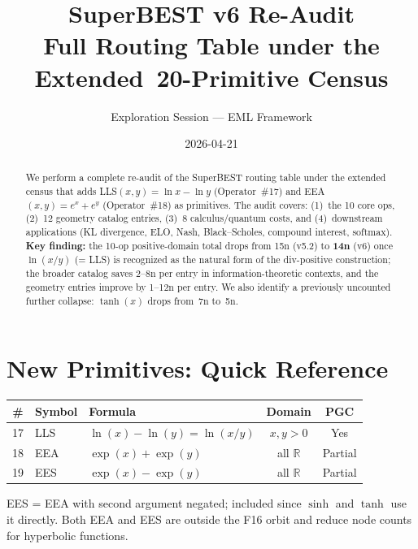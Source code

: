 \documentclass[11pt]{article}
\title{SuperBEST v6 Re-Audit\\
{\large Full Routing Table under the Extended~20-Primitive Census}}
\author{Exploration Session --- EML Framework}
\date{2026-04-21}
\begin{document}
\maketitle

\begin{abstract}
We perform a complete re-audit of the SuperBEST routing table under the
extended census that adds LLS$(x,y)=\ln x - \ln y$ (Operator~\#17) and
EEA$(x,y)=e^x+e^y$ (Operator~\#18) as primitives.
The audit covers: (1)~the 10 core ops, (2)~12 geometry catalog entries,
(3)~8 calculus/quantum costs, and (4)~downstream applications
(KL divergence, ELO, Nash, Black--Scholes, compound interest, softmax).
\textbf{Key finding:} the 10-op positive-domain total drops from 15n (v5.2) to
\textbf{14n} (v6) once $\ln(x/y)$ (= LLS) is recognized as the natural form
of the div-positive construction; the broader catalog saves 2--8n per entry
in information-theoretic contexts, and the geometry entries improve by
1--12n per entry. We also identify a previously uncounted further collapse:
$\tanh(x)$ drops from~7n to~5n.
\end{abstract}

\tableofcontents
\bigskip

\section{New Primitives: Quick Reference}
\label{sec:primitives}

\begin{center}
\begin{tabular}{cllcc}
\toprule
\# & Symbol & Formula & Domain & PGC \\
\midrule
17 & LLS & $\ln(x) - \ln(y) = \ln(x/y)$ & $x,y>0$ & Yes \\
18 & EEA & $\exp(x) + \exp(y)$ & all $\mathbb{R}$ & Partial \\
19 & EES & $\exp(x) - \exp(y)$ & all $\mathbb{R}$ & Partial \\
\bottomrule
\end{tabular}
\end{center}

\noindent EES = EEA with second argument negated; included since $\sinh$ and $\tanh$
use it directly. Both EEA and EES are outside the F16 orbit and reduce
node counts for hyperbolic functions.

\end{document}

